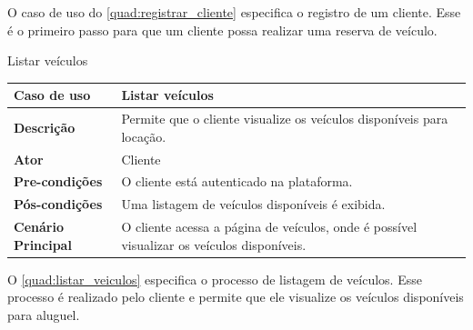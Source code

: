 O caso de uso do \autoref{quad:registrar_cliente} especifica o registro de um cliente. Esse é o primeiro passo para que um cliente possa realizar uma reserva de veículo.

\begin{quadro}[H]
    \centering
    \caption{Listar veículos}
    \label{quad:listar_veiculos}
    \begin{tabular}{|p{1.2in}|p{3.5in}|}
    \hline
    
    \textbf{Caso de uso} & Listar veículos \\ \hline
    \textbf{Descrição} & Permite que o cliente visualize os veículos disponíveis para locação. \\ \hline
    \textbf{Ator} & Cliente \\ \hline
    \textbf{Pre-condições} & O cliente está autenticado na plataforma. \\ \hline
    \textbf{Pós-condições} & Uma listagem de veículos disponíveis é exibida. \\ \hline
    \textbf{Cenário Principal} & O cliente acessa a página de veículos, onde é possível visualizar os veículos disponíveis. \\ \hline
    
    \end{tabular}
\end{quadro}

O \autoref{quad:listar_veiculos} especifica o processo de listagem de veículos. Esse processo é realizado pelo cliente e permite que ele visualize os veículos disponíveis para aluguel.

